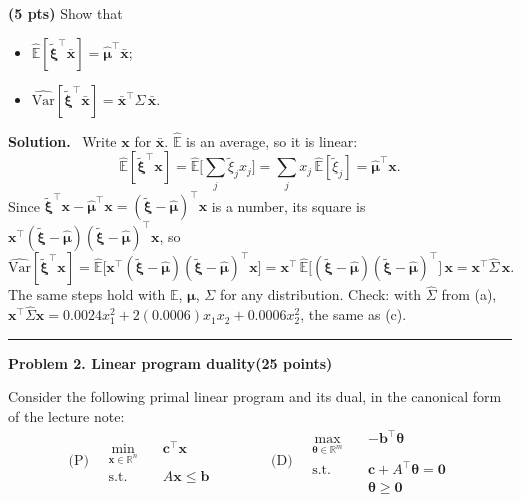 \documentclass[10pt]{article}
\newcommand{\problem}[2]{%
  \par\bigskip
  {\color{ruleink}\rule{\textwidth}{1pt}}\par\nobreak\vspace{3pt}
  {\large\bfseries #2}\hfill{\normalsize\bfseries(#1 points)}\par\nobreak\vspace{4pt}}
\newenvironment{solution}
  {\par\smallskip\begingroup\color{solink}\textbf{Solution.}\ }
  {\par\endgroup}
\begin{document}
\begin{parts}
\item \textbf{(5 pts)} Show that
  \begin{itemize}[leftmargin=2.2em, itemsep=2pt, topsep=3pt]
    \item $\widehat{\mathbb{E}}[\tilde{\bm{\xi}}^{\top}\bar{\bm{x}}] = \widehat{\bm{\mu}}^{\top}\bar{\bm{x}}$;
    \item $\widehat{\mathrm{Var}}[\tilde{\bm{\xi}}^{\top}\bar{\bm{x}}] = \bar{\bm{x}}^{\top}\widehat{\Sigma}\, \bar{\bm{x}}$.
  \end{itemize}

\begin{solution}
Write $\bm{x}$ for $\bar{\bm{x}}$. $\widehat{\mathbb{E}}$ is an average, so it is linear:
\[
  \widehat{\mathbb{E}}[\tilde{\bm{\xi}}^{\top}\bm{x}] = \widehat{\mathbb{E}}\Big[\sum_j \tilde{\xi}_j x_j\Big]
  = \sum_j x_j\, \widehat{\mathbb{E}}[\tilde{\xi}_j] = \widehat{\bm{\mu}}^{\top}\bm{x} .
\]
Since $\tilde{\bm{\xi}}^{\top}\bm{x} - \widehat{\bm{\mu}}^{\top}\bm{x} = (\tilde{\bm{\xi}} - \widehat{\bm{\mu}})^{\top}\bm{x}$ is a number, its square is
$\bm{x}^{\top}(\tilde{\bm{\xi}} - \widehat{\bm{\mu}})(\tilde{\bm{\xi}} - \widehat{\bm{\mu}})^{\top}\bm{x}$, so
\[
  \widehat{\mathrm{Var}}[\tilde{\bm{\xi}}^{\top}\bm{x}]
  = \widehat{\mathbb{E}}\big[\bm{x}^{\top}(\tilde{\bm{\xi}} - \widehat{\bm{\mu}})(\tilde{\bm{\xi}} - \widehat{\bm{\mu}})^{\top}\bm{x}\big]
  = \bm{x}^{\top}\,\widehat{\mathbb{E}}\big[(\tilde{\bm{\xi}} - \widehat{\bm{\mu}})(\tilde{\bm{\xi}} - \widehat{\bm{\mu}})^{\top}\big]\,\bm{x}
  = \bm{x}^{\top}\widehat{\Sigma}\, \bm{x} .
\]
The same steps hold with $\mathbb{E}$, $\bm{\mu}$, $\Sigma$ for any distribution.
Check: with $\widehat{\Sigma}$ from (a),
$\bm{x}^{\top}\widehat{\Sigma} \bm{x} = 0.0024x_1^2 + 2(0.0006)x_1x_2 + 0.0006x_2^2$, the same as (c).
\end{solution}
\end{parts}

\problem{25}{Problem 2. Linear program duality}

Consider the following primal linear program and its dual, in the canonical form of the lecture note:
\[
\text{(P)} \quad
\begin{aligned}
  \min_{\bm{x} \in \mathbb{R}^n} \quad & \bm{c}^{\top}\bm{x} \\
  \text{s.t.} \quad & A\bm{x} \le \bm{b}
\end{aligned}
\qquad\qquad
\text{(D)} \quad
\begin{aligned}
  \max_{\bm{\theta} \in \mathbb{R}^m} \quad & -\bm{b}^{\top}\bm{\theta} \\
  \text{s.t.} \quad & \bm{c} + A^{\top}\bm{\theta} = \bm{0} \\
                    & \bm{\theta} \ge \bm{0}
\end{aligned}
\]
\end{document}
